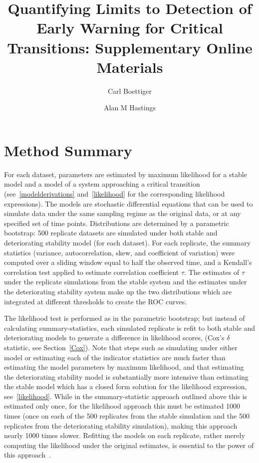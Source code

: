 \documentclass[authoryear, preprint,review,12pt]{elsarticle}
\begin{document}
\begin{frontmatter}
\title{Quantifying Limits to Detection of Early Warning for Critical Transitions: Supplementary Online Materials}
\author[davis]{Carl Boettiger}
\author[davis]{Alan M Hastings}
\address[davis]{Center for Population Biology, University of California, Davis, United States}
\end{frontmatter}

\appendix
\renewcommand*\thefigure{S\arabic{figure}}
\renewcommand*\theequation{S\arabic{equation}}

\section{Method Summary}
For each dataset, parameters are estimated by maximum likelihood for a stable model and a model of a system approaching a critical transition (see~\ref{modelderivations} and~\ref{likelihood} for the corresponding likelihood expressions).  The models are stochastic differential equations that can be used to simulate data under the same sampling regime as the original data, or at any specified set of time points.  Distributions are determined by a parametric bootstrap: 500 replicate datasets are simulated under both stable and deteriorating stability model (for each dataset).  For each replicate, the summary statistics (variance, autocorrelation, skew, and coefficient of variation) were computed over a sliding window equal to half the observed time, and a Kendall's correlation test applied to estimate correlation coefficient $\tau$.  The estimates of $\tau$ under the replicate simulations from the stable system and the estimates under the deteriorating stability system make up the two distributions which are integrated at different thresholds to create the ROC curves. 

The likelihood test is performed as in the parametric bootstrap; but instead of calculating summary-statistics, each simulated replicate is refit to both stable and deteriorating models to generate a difference in likelihood scores, (Cox's $\delta$ statistic, see Section~\ref{Cox}).  Note that steps such as simulating under either model or estimating each of the indicator statistics are much faster than estimating the model parameters by maximum likelihood, and that estimating the deteriorating stability model is substantially more intensive than estimating the stable model which has a closed form solution for the likelihood expression, see~\ref{likelihood}.  While in the summary-statistic approach outlined above this is estimated only once, for the likelihood approach this must be estimated 1000 times (once on each of the 500 replicates from the stable simulation and the 500 replicates from the deteriorating stability simulation), making this approach nearly 1000 times slower.  Refitting the models on each replicate, rather merely computing the likelihood under the original estimates, is essential to the power of this approach~\citep{Huelsenbeck1996}.
\end{document}

